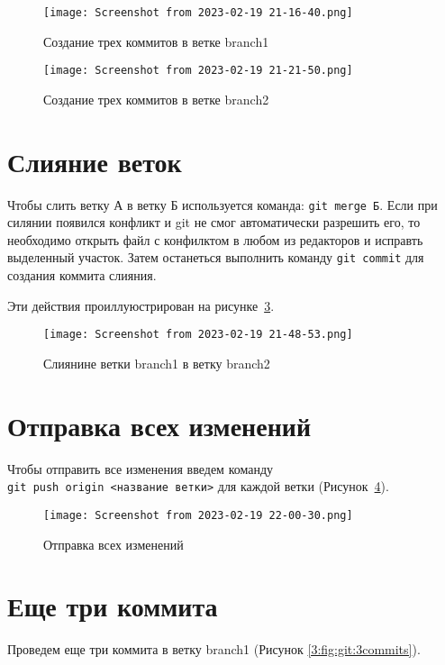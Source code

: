 \begin{figure}[h!tp]
	\centering
	\texttt{[image: Screenshot from 2023-02-19 21-16-40.png]}
	\caption{Создание трех коммитов в ветке branch1}
	\label{3:fig:git:branch:1:commits}
\end{figure}
\begin{figure}[h!tp]
	\centering
	\texttt{[image: Screenshot from 2023-02-19 21-21-50.png]}
	\caption{Создание трех коммитов в ветке branch2}
	\label{3:fig:git:branch:2:commits}
\end{figure}

\section{Слияние веток}
\label{3:lb:git:merge:conflict}
Чтобы слить ветку А в ветку Б используется команда: \texttt{git merge Б}.
Если при силянии появился конфликт и git не смог автоматически разрешить его,
то необходимо открыть файл с конфилктом в любом из редакторов и исправть
выделенный участок. Затем останеться выполнить команду \texttt{git commit}
для создания коммита слияния. 

Эти действия проиллуюстрирован на рисунке~\ref{3:fig:git:merge}.

\begin{figure}[h!tp]
	\centering
	\texttt{[image: Screenshot from 2023-02-19 21-48-53.png]}
	\caption{Слиянине ветки branch1 в ветку branch2}
	\label{3:fig:git:merge}
\end{figure}

\section{Отправка всех изменений}
Чтобы отправить все изменения введем команду
\texttt{git~push~origin~<название~ветки>} для каждой ветки
(Рисунок~\ref{3:fig:git:push:all}).

\begin{figure}[h!tp]
	\centering
	\texttt{[image: Screenshot from 2023-02-19 22-00-30.png]}
	\caption{Отправка всех изменений}
	\label{3:fig:git:push:all}
\end{figure}

\section{Еще три коммита}
Проведем еще три коммита в ветку branch1 (Рисунок \ref{3:fig:git:3commits}).

